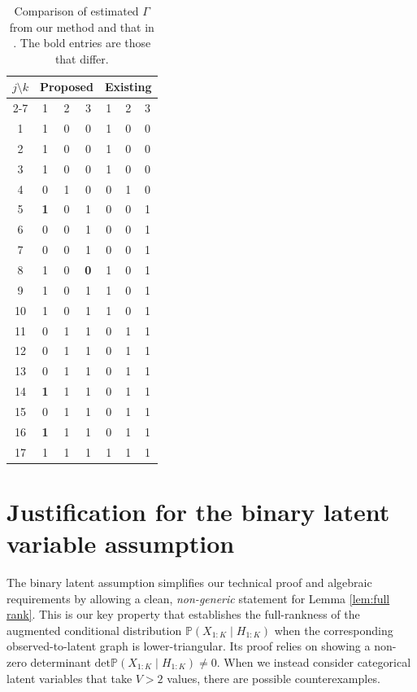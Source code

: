 \documentclass[10pt]{article} %
\newcommand{\PP}{\mathbb P}
\begin{document}
\begin{table}[h!]
    \centering
    \begin{tabular}{c|ccc|ccc}
        \toprule
        \multirow{2}{*}{$j \setminus k$} &  \multicolumn{3}{c}{Proposed}  &  \multicolumn{3}{c}{Existing} \\
        \cmidrule{2-7}
         & 1 & 2 & 3 & 1 & 2 & 3 \\
        \midrule
        1 & 1 & 0 & 0 & 1 & 0 & 0 \\
        2 & 1 & 0 & 0 & 1 & 0 & 0 \\
        3 & 1 & 0 & 0 & 1 & 0 & 0 \\
        4 & 0 & 1 & 0 & 0 & 1 & 0 \\
        5 & \textbf{1} & 0 & 1 & 0 & 0 & 1 \\
        6 & 0 & 0 & 1 & 0 & 0 & 1 \\
        7 & 0 & 0 & 1 & 0 & 0 & 1 \\
        8 & 1 & 0 & \textbf{0} & 1 & 0 & 1 \\
        9 & 1 & 0 & 1 & 1 & 0 & 1 \\
        10 & 1 & 0 & 1 & 1 & 0 & 1 \\
        11 & 0 & 1 & 1 & 0 & 1 & 1 \\
        12 & 0 & 1 & 1 & 0 & 1 & 1 \\
        13 & 0 & 1 & 1 & 0 & 1 & 1 \\
        14 & \textbf{1} & 1 & 1 & 0 & 1 & 1 \\
        15 & 0 & 1 & 1 & 0 & 1 & 1 \\
        16 & \textbf{1} & 1 & 1 & 0 & 1 & 1 \\
        17 & 1 & 1 & 1 & 1 & 1 & 1 \\
        \bottomrule
    \end{tabular}
    \caption{Comparison of estimated $\Gamma$ from our method and that in \cite{chen2015statistical}. The bold entries are those that differ.}
    \label{tab:fraction}
\end{table}

\section{Justification for the binary latent variable assumption}\label{sec:binary}

The binary latent assumption simplifies our technical proof and algebraic requirements by allowing a clean, \emph{non-generic} statement for Lemma \ref{lem:full rank}. This is our key property that establishes the full-rankness of the augmented conditional distribution $\PP(X_{1:K} \mid H_{1:K})$ when the corresponding observed-to-latent graph is lower-triangular. Its proof relies on showing a non-zero determinant $\text{det} \PP(X_{1:K} \mid H_{1:K}) \neq 0$. When we instead consider categorical latent variables that take $V>2$ values, there are possible counterexamples.
\end{document}
